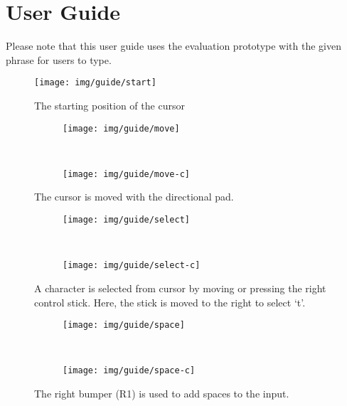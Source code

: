 \documentclass[guide.tex]{subfiles}
\begin{document}
\section{User Guide} %
\label{sec:user_guide}
Please note that this user guide uses the evaluation prototype with the given
phrase for users to type.

\begin{figure}[H]
    \centering
    \texttt{[image: img/guide/start]}
    \caption{The starting position of the cursor}
    \label{fig:start}
\end{figure}

\begin{figure}[H]
    \centering
    \begin{subfigure}[b]{0.65\textwidth}
        \texttt{[image: img/guide/move]}
        \label{fig:move_guide}
    \end{subfigure}
    ~
    \begin{subfigure}[b]{0.3\textwidth}
        \texttt{[image: img/guide/move-c]}
        \label{fig:move_input}
    \end{subfigure}
    \caption{The cursor is moved with the directional pad.}
\end{figure}

\begin{figure}[H]
    \centering
    \begin{subfigure}[b]{0.65\textwidth}
        \texttt{[image: img/guide/select]}
        \label{fig:select_guide}
    \end{subfigure}
    ~
    \begin{subfigure}[b]{0.3\textwidth}
        \texttt{[image: img/guide/select-c]}
        \label{fig:select_input}
    \end{subfigure}
    \caption{A character is selected from cursor by moving or pressing the
    right control stick. Here, the stick is moved to the right to select `t'.}
\end{figure}

\begin{figure}[H]
    \centering
    \begin{subfigure}[b]{0.65\textwidth}
        \texttt{[image: img/guide/space]}
        \label{fig:space_guide}
    \end{subfigure}
    ~
    \begin{subfigure}[b]{0.3\textwidth}
        \texttt{[image: img/guide/space-c]}
        \label{fig:space_input}
    \end{subfigure}
    \caption{The right bumper (R1) is used to add spaces to the input.}
\end{figure}
\end{document}
